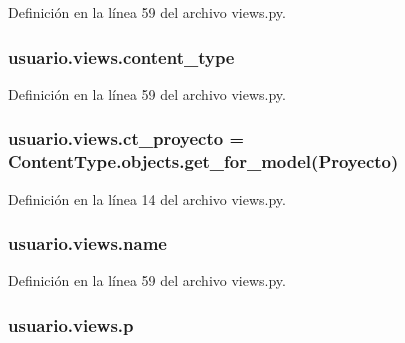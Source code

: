 Definición en la línea 59 del archivo views.\+py.

\subsubsection[{\texorpdfstring{content\+\_\+type}{content_type}}]{\setlength{\rightskip}{0pt plus 5cm}usuario.\+views.\+content\+\_\+type}\hypertarget{namespaceusuario_1_1views_aef6a1060a6b410adfb273991886184cf}{}\label{namespaceusuario_1_1views_aef6a1060a6b410adfb273991886184cf}


Definición en la línea 59 del archivo views.\+py.

\subsubsection[{\texorpdfstring{ct\+\_\+proyecto}{ct_proyecto}}]{\setlength{\rightskip}{0pt plus 5cm}usuario.\+views.\+ct\+\_\+proyecto = Content\+Type.\+objects.\+get\+\_\+for\+\_\+model({\bf Proyecto})}\hypertarget{namespaceusuario_1_1views_a592da1d9867c21c536be49a1ab5b7361}{}\label{namespaceusuario_1_1views_a592da1d9867c21c536be49a1ab5b7361}


Definición en la línea 14 del archivo views.\+py.

\subsubsection[{\texorpdfstring{name}{name}}]{\setlength{\rightskip}{0pt plus 5cm}usuario.\+views.\+name}\hypertarget{namespaceusuario_1_1views_a23bd2b0f3efef86a7657aedbbb7a4b3a}{}\label{namespaceusuario_1_1views_a23bd2b0f3efef86a7657aedbbb7a4b3a}


Definición en la línea 59 del archivo views.\+py.

\subsubsection[{\texorpdfstring{p}{p}}]{\setlength{\rightskip}{0pt plus 5cm}usuario.\+views.\+p}\hypertarget{namespaceusuario_1_1views_a9c613e5b69ad136aac1d7051827b9969}{}\label{namespaceusuario_1_1views_a9c613e5b69ad136aac1d7051827b9969}


